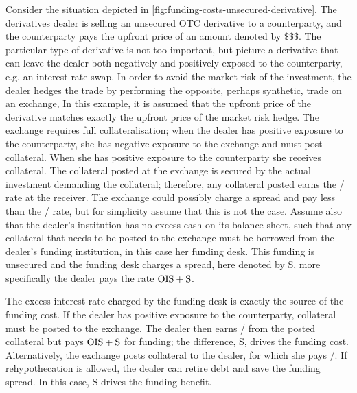 \documentclass[main.tex]{subfiles}
\begin{document}
        \begin{example}
        Consider the situation depicted in \cref{fig:funding-costs-unsecured-derivative}.
        The derivatives dealer is selling an unsecured OTC derivative to a counterparty,
        and the counterparty pays the upfront price of an amount denoted by $\$\$\$$.
        The particular type of derivative is not too important, 
        but picture a derivative that can leave the dealer both negatively and positively exposed to the counterparty, 
        e.g. an interest rate swap.
        In order to avoid the market risk of the investment, 
        the dealer hedges the trade by performing the opposite, 
        perhaps synthetic, trade on an exchange,
        In this example, it is assumed that the upfront price of the derivative 
        matches exactly the upfront price of the market risk hedge.
        The exchange requires full collateralisation;
        when the dealer has positive exposure to the counterparty, 
        she has negative exposure to the exchange and must post collateral. 
        When she has positive exposure to the counterparty she receives collateral.
        The collateral posted at the exchange is secured by the actual investment demanding the collateral;
        therefore, any collateral posted earns the \OIS/ rate at the receiver.
        The exchange could possibly charge a spread and pay less than the \OIS/ rate,
        but for simplicity assume that this is not the case.
        Assume also that the dealer's institution has no excess cash on its balance sheet, 
        such that any collateral that needs to be posted to the exchange 
        must be borrowed from the dealer's funding institution,
        in this case her funding desk. 
        This funding is unsecured and the funding desk charges a spread, here denoted by S,
        more specifically the dealer pays the rate $\OIS/ + \text{S}$.

        The excess interest rate charged by the funding desk is exactly the source of the funding cost.
        If the dealer has positive exposure to the counterparty, collateral must be posted to the exchange.
        The dealer then earns \OIS/ from the posted collateral but pays $\OIS/ + \text{S}$ for funding;
        the difference, S, drives the funding cost.
        Alternatively, the exchange posts collateral to the dealer, for which she pays \OIS/.
        If rehypothecation is allowed, the dealer can retire debt and save the funding spread.
        In this case, S drives the funding benefit.
        \end{example}
\end{document}

